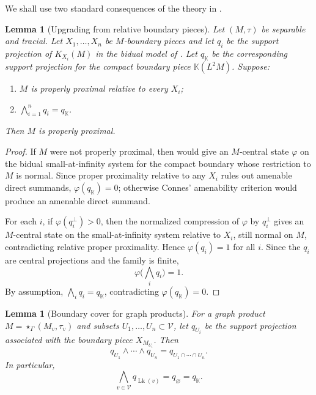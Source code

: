 \documentclass[12pt]{article}
\newtheorem{lemma}[theorem]{Lemma}
\theoremstyle{definition}
\newcommand{\V}{\mathcal V}
\newcommand{\Lk}{\operatorname{Lk}}
\newcommand{\K}{\mathbb K}
\begin{document}
We shall use two standard consequences of the theory in \cite{DKEP}.

\begin{lemma}[Upgrading from relative boundary pieces]\label{lem:upgrade}
Let $(M,\tau)$ be separable and tracial.  Let $X_1,\dots,X_n$ be $M$-boundary pieces and let $q_i$ be the support projection of $K_{X_i}(M)$ in the bidual model of \cite[Section 8]{DKEP}.  Let $q_{\K}$ be the corresponding support projection for the compact boundary piece $\K(L^2M)$.  Suppose:
\begin{enumerate}[label=(\roman*)]
\item $M$ is properly proximal relative to every $X_i$;
\item $\bigwedge_{i=1}^n q_i=q_{\K}$.
\end{enumerate}
Then $M$ is properly proximal.
\end{lemma}

\begin{proof}
If $M$ were not properly proximal, then \cite[Theorem 8.5]{DKEP} would give an $M$-central state $\varphi$ on the bidual small-at-infinity system for the compact boundary whose restriction to $M$ is normal.  Since proper proximality relative to any $X_i$ rules out amenable direct summands, $\varphi(q_{\K})=0$; otherwise Connes' amenability criterion would produce an amenable direct summand.

For each $i$, if $\varphi(q_i^\perp)>0$, then the normalized compression of $\varphi$ by $q_i^\perp$ gives an $M$-central state on the small-at-infinity system relative to $X_i$, still normal on $M$, contradicting relative proper proximality.  Hence $\varphi(q_i)=1$ for all $i$.  Since the $q_i$ are central projections and the family is finite,
\[
\varphi\Big(\bigwedge_i q_i\Big)=1.
\]
By assumption, $\bigwedge_i q_i=q_{\K}$, contradicting $\varphi(q_{\K})=0$.
\end{proof}

\begin{lemma}[Boundary cover for graph products]\label{lem:boundary-cover}
For a graph product $M=\star_{\Gamma}(M_v,\tau_v)$ and subsets $U_1,\dots,U_n\subset \V$, let $q_{U_i}$ be the support projection associated with the boundary piece $X_{M_{U_i}}$.  Then
\[
q_{U_1}\wedge\cdots\wedge q_{U_n}=q_{U_1\cap\cdots\cap U_n}.
\]
In particular,
\[
\bigwedge_{v\in \V} q_{\Lk(v)}=q_\varnothing=q_{\K}.
\]
\end{lemma}
\end{document}
